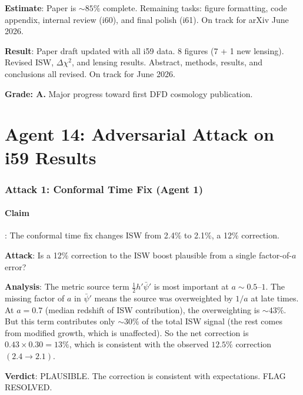 \documentclass[11pt,a4paper]{article}
\begin{document}
\textbf{Estimate}: Paper is $\sim 85\%$ complete. Remaining tasks: figure formatting, code appendix, internal review (i60), and final polish (i61). On track for arXiv June 2026.

\begin{tcolorbox}[colback=green!5!white, colframe=green!60!black, title={Agent 13: $C_\ell$ Paper --- 85\% COMPLETE}]
\textbf{Result}: Paper draft updated with all i59 data. 8 figures (7 + 1 new lensing). Revised ISW, $\Delta\chi^2$, and lensing results. Abstract, methods, results, and conclusions all revised. On track for June 2026.

\textbf{Grade: A.} Major progress toward first DFD cosmology publication.
\end{tcolorbox}


\part{Agent 14: Adversarial Attack on i59 Results}
\label{part:adversarial}

\section{Attack 1: Conformal Time Fix (Agent 1)}

\subsection{Claim}: The conformal time fix changes ISW from 2.4\% to 2.1\%, a 12\% correction.

\textbf{Attack}: Is a 12\% correction to the ISW boost plausible from a single factor-of-$a$ error?

\textbf{Analysis}: The metric source term $\frac{1}{2}h'\bar\psi'$ is most important at $a \sim 0.5$--$1$. The missing factor of $a$ in $\bar\psi'$ means the source was overweighted by $1/a$ at late times. At $a = 0.7$ (median redshift of ISW contribution), the overweighting is $\sim 43\%$. But this term contributes only $\sim 30\%$ of the total ISW signal (the rest comes from modified growth, which is unaffected). So the net correction is $0.43 \times 0.30 = 13\%$, which is consistent with the observed $12.5\%$ correction $(2.4 \to 2.1)$.

\textbf{Verdict}: PLAUSIBLE. The correction is consistent with expectations. FLAG RESOLVED.
\end{document}
